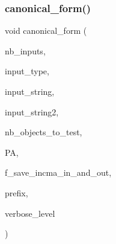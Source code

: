 \subsubsection{\texorpdfstring{canonical\+\_\+form()}{canonical\_form()}}
{\footnotesize\ttfamily void canonical\+\_\+form (\begin{DoxyParamCaption}\item[{\mbox{\hyperlink{galois_8h_a09fddde158a3a20bd2dcadb609de11dc}{I\+NT}}}]{nb\+\_\+inputs,  }\item[{\mbox{\hyperlink{galois_8h_a09fddde158a3a20bd2dcadb609de11dc}{I\+NT}} $\ast$}]{input\+\_\+type,  }\item[{const \mbox{\hyperlink{galois_8h_ab6cc7b4aeb6ea31aba2b3fbfc83ff5e6}{B\+Y\+TE}} $\ast$$\ast$}]{input\+\_\+string,  }\item[{const \mbox{\hyperlink{galois_8h_ab6cc7b4aeb6ea31aba2b3fbfc83ff5e6}{B\+Y\+TE}} $\ast$$\ast$}]{input\+\_\+string2,  }\item[{\mbox{\hyperlink{galois_8h_a09fddde158a3a20bd2dcadb609de11dc}{I\+NT}}}]{nb\+\_\+objects\+\_\+to\+\_\+test,  }\item[{\mbox{\hyperlink{classprojective__space__with__action}{projective\+\_\+space\+\_\+with\+\_\+action}} $\ast$}]{PA,  }\item[{\mbox{\hyperlink{galois_8h_a09fddde158a3a20bd2dcadb609de11dc}{I\+NT}}}]{f\+\_\+save\+\_\+incma\+\_\+in\+\_\+and\+\_\+out,  }\item[{const \mbox{\hyperlink{galois_8h_ab6cc7b4aeb6ea31aba2b3fbfc83ff5e6}{B\+Y\+TE}} $\ast$}]{prefix,  }\item[{\mbox{\hyperlink{galois_8h_a09fddde158a3a20bd2dcadb609de11dc}{I\+NT}}}]{verbose\+\_\+level }\end{DoxyParamCaption})}

\mbox{\label{projective__space__main_8_c_a32275eacc4bdda93b2b34c2a9217a088}} 
